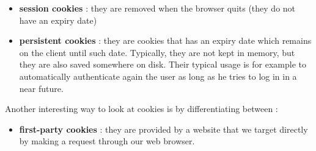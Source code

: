 \begin{itemize}
\item \textbf{session cookies} : they are removed when the browser quits (they do not have an expiry date)
\item \textbf{persistent cookies} : they are cookies that has an expiry date which remains on the client until such date. Typically, they are not kept in memory, but they are also saved somewhere on disk. Their typical usage is for example to automatically authenticate again the user as long as he tries to log in in a near future.
\end{itemize}
Another interesting way to look at cookies is by differentiating between :
\begin{itemize}
\item \textbf{first-party cookies} : they are provided by a website that we target directly by making a request through our web browser. 

\end{itemize}
